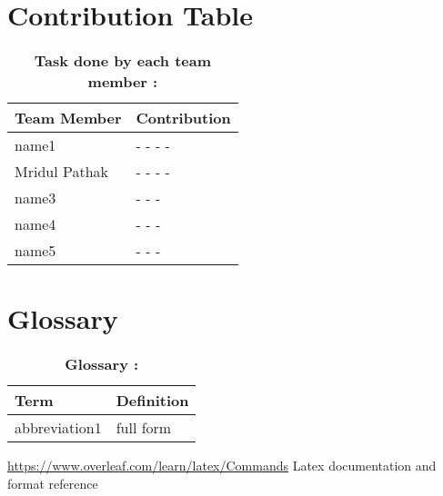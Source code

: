 \documentclass[11pt, a4paper]{supplemental-document}
\begin{document}
\section{Contribution Table}
\begin{table}[H]
\centering
\caption{\bf Task done by each team member :}
\begin{tabular}{||p{4cm}||p{7cm}||}
\hline
Team Member & Contribution \\
\hline\hline
name1 & {-  \newline
-  \newline
-  \newline
- }\\
\hline
Mridul Pathak & {- \newline
-  \newline
-  \newline
-  }\\
\hline
name3 & {- \newline
- \newline
- }\\
\hline
name4 & {
-  \newline 
-  \newline
-  }\\
\hline
name5 & {
-  \newline
-  \newline
- } \\
\hline
\end{tabular}
\label{tab:Work done by each team member}
 \end{table}
\section{Glossary}

\begin{table}[H]
\centering
\caption{\bf Glossary :}
\begin{tabular}{||p{2cm}||p{9cm}||}
\hline
Term & Definition \\
\hline\hline
abbreviation1 & full form\\
\hline
\end{tabular}
\label{tab:Work done by each team member}
\end{table}

\newpage
\begin{thebibliography}{1}

 \url{https://www.overleaf.com/learn/latex/Commands}
 Latex documentation and format reference\\
\end{thebibliography}
\end{document}
